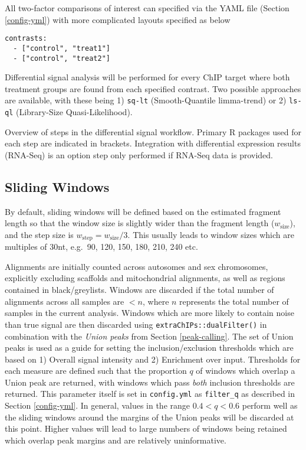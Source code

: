 \documentclass[
]{book}
\begin{document}
All two-factor comparisons of interest can specified via the YAML file (Section \ref{config-yml}) with more complicated layouts specified as below

\begin{verbatim}
contrasts:
  - ["control", "treat1"]
  - ["control", "treat2"]
\end{verbatim}

Differential signal analysis will be performed for every ChIP target where both treatment groups are found from each specified contrast.
Two possible approaches are available, with these being 1) \texttt{sq-lt} (Smooth-Quantile limma-trend) or 2) \texttt{ls-ql} (Library-Size Quasi-Likelihood).

\label{fig:unnamed-chunk-4}Overview of steps in the differential signal workflow. Primary R packages used for each step are indicated in brackets. Integration with differential expression results (RNA-Seq) is an option step only performed if RNA-Seq data is provided.

\hypertarget{sliding-windows}{%
\subsection*{Sliding Windows}\label{sliding-windows}}

By default, sliding windows will be defined based on the estimated fragment length so that the window size is slightly wider than the fragment length (\(w_\text{size}\)), and the step size is \(w_\text{step} = w_\text{size} / 3\).
This usually leads to window sizes which are multiples of 30nt, e.g.~90, 120, 150, 180, 210, 240 etc.

Alignments are initially counted across autosomes and sex chromosomes, explicitly excluding scaffolds and mitochondrial alignments, as well as regions contained in black/greylists.
Windows are discarded if the total number of alignments across all samples are \(<n\), where \(n\) represents the total number of samples in the current analysis.
Windows which are more likely to contain noise than true signal are then discarded using \texttt{extraChIPs::dualFilter()} in combination with the \emph{Union peaks} from Section \ref{peak-calling}.
The set of Union peaks is used as a guide for setting the inclusion/exclusion thresholds which are based on 1) Overall signal intensity and 2) Enrichment over input.
Thresholds for each measure are defined such that the proportion \(q\) of windows which overlap a Union peak are returned, with windows which pass \emph{both} inclusion thresholds are returned.
This parameter itself is set in \texttt{config.yml} as \texttt{filter\_q} as described in Section \ref{config-yml}.
In general, values in the range \(0.4 < q < 0.6\) perform well as the sliding windows around the margins of the Union peaks will be discarded at this point.
Higher values will lead to large numbers of windows being retained which overlap peak margins and are relatively uninformative.
\end{document}
